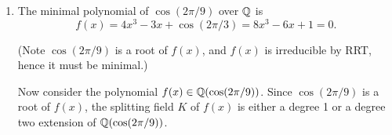 \documentclass[12pt]{article}
\begin{document}
\begin{solution}
\begin{enumerate}
        Since $[\Q(\zeta_{2p}): \Q(\cos(\pi/2))] \geq 2$ and $[\Q(\zeta_{2p}): \Q(\cos(\pi/2))] \leq 2$, then
        
        $[\Q(\zeta_{2p}): \Q(\cos(\pi/2))] = 2$. 

        Also from part(1), we know that $[\Q(\zeta_{2p}): \Q] = p-1$. 
        
      \[
\begin{tikzcd}
\mathbb{Q}(\zeta_{2p}) & {} \\
\mathbb{Q}(\cos(\pi/p)) \arrow{u}{2} & {} \\
\mathbb{Q} \arrow{u}{n} 
\arrow[bend left=-70, shorten >=-4pt, swap]{uu}{p-1} & {}
\end{tikzcd}
\]

    Then, $ n = (p-1)/2$ (by tower law).

    \bbni

    $\Q(\cos(2\pi/p))$
    
    Similarly, 
        \[\zeta_{p} = e^{{2\pi i}/p} = \cos(2\pi/p) + i \sin(2\pi/p)\]
    That is, 
    $\Q(\cos(2\pi/p)) \subset \Q(\zeta_{p})$, with $\zeta_p \notin \Q(\cos(2\pi/p))$. And by the same logic the following two equations hold: 
    \[[\Q(\zeta_{p}): \Q(\cos(2\pi/2))] \geq 2\]
    and 
    \[[\Q(\zeta_{p}): \Q(\cos(2\pi/2))] = [\Q(\cos(2\pi/2))(i\sin(2\pi/2)): \Q(\cos(2\pi/2))]\leq 2\]
    
    $\implies [\Q(\zeta_{p}): \Q(\cos(2\pi/2))] = 2$ 

        \[
        \begin{tikzcd}
        \mathbb{Q}(\zeta_{p}) & {} \\
        \mathbb{Q}(\cos(2\pi/p)) \arrow{u}{2} & {} \\
        \mathbb{Q} \arrow{u}{n} 
        \arrow[bend left=-75, shorten >=-4pt, swap]{uu}{p-1} & {}
        \end{tikzcd}
        \]
    $\implies n = (p-1)/2$ (by tower law). 

    \item The minimal polynomial of $\cos(2\pi/9)$ over $\mathbb Q$ is 
    \[f(x) = 4x^3 - 3x + \cos(2\pi/3) = 8x^3 - 6x + 1 = 0.\]

    (Note $\cos(2\pi/9)$ is a root of $f(x)$, and $f(x)$ is irreducible by RRT, hence it must be minimal.)

    Now consider the polynomial $f(x) \in \mathbb Q(\cos(2\pi/9))$. Since $\cos(2\pi/9)$ is a root of $f(x)$, the splitting field $K$ of $f(x)$ is either a degree 1 or a degree two extension of $\mathbb Q(\cos(2\pi/9))$.


\end{enumerate}
\end{solution}
\end{document}

